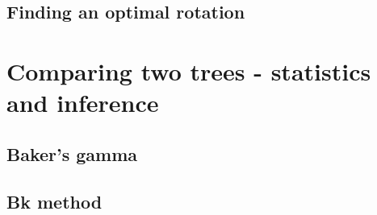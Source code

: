 \documentclass[shortnames,nojss,article]{jss}\usepackage{graphicx, color}
\begin{document}
\subsection{Finding an optimal rotation}


\section{Comparing two trees - statistics and inference}

\subsection{Baker's gamma}

\subsection{Bk method}














% 
% 
% 
% 
% 
%   
%   
% 
% 

\end{document}
